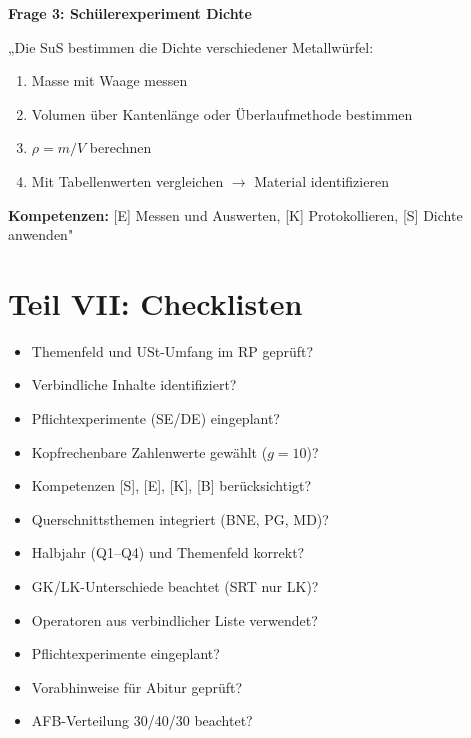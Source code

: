 \documentclass[11pt,a4paper]{article}
\newcommand{\checkbox}{$\square$}
\begin{document}
\textbf{Frage 3: Schülerexperiment Dichte}

„Die SuS bestimmen die Dichte verschiedener Metallwürfel:
\begin{enumerate}[leftmargin=0.5cm, itemsep=1pt]
\item Masse mit Waage messen
\item Volumen über Kantenlänge oder Überlaufmethode bestimmen
\item $\rho = m/V$ berechnen
\item Mit Tabellenwerten vergleichen $\rightarrow$ Material identifizieren
\end{enumerate}
\textbf{Kompetenzen:} [E] Messen und Auswerten, [K] Protokollieren, [S] Dichte anwenden"

\newpage
\part*{Teil VII: Checklisten}

\begin{checklistbox}
\begin{itemize}[leftmargin=0.5cm, label=\checkbox]
\item Themenfeld und USt-Umfang im RP geprüft?
\item Verbindliche Inhalte identifiziert?
\item Pflichtexperimente (SE/DE) eingeplant?
\item Kopfrechenbare Zahlenwerte gewählt ($g = 10$)?
\item Kompetenzen [S], [E], [K], [B] berücksichtigt?
\item Querschnittsthemen integriert (BNE, PG, MD)?
\end{itemize}
\end{checklistbox}

\vspace{0.5cm}

\begin{checklistbox}
\begin{itemize}[leftmargin=0.5cm, label=\checkbox]
\item Halbjahr (Q1--Q4) und Themenfeld korrekt?
\item GK/LK-Unterschiede beachtet (SRT nur LK)?
\item Operatoren aus verbindlicher Liste verwendet?
\item Pflichtexperimente eingeplant?
\item Vorabhinweise für Abitur geprüft?
\item AFB-Verteilung 30/40/30 beachtet?
\end{itemize}
\end{checklistbox}
\end{document}
